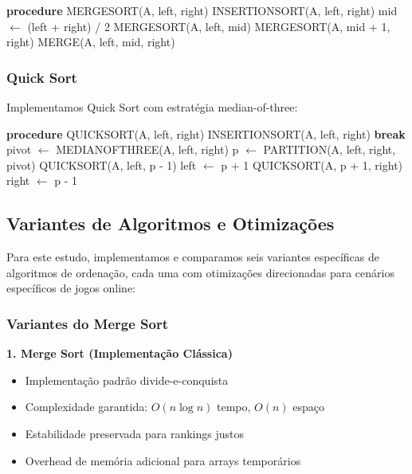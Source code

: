 \documentclass[conference]{IEEEtran}
\begin{document}
\begin{algorithmic}[1]
\STATE \textbf{procedure} MERGESORT(A, left, right)
    \STATE INSERTIONSORT(A, left, right)
\ELSE
    \STATE mid $\leftarrow$ (left + right) / 2
    \STATE MERGESORT(A, left, mid)
    \STATE MERGESORT(A, mid + 1, right)
    \STATE MERGE(A, left, mid, right)
\ENDIF
\end{algorithmic}

\subsubsection{Quick Sort}
Implementamos Quick Sort com estratégia median-of-three:

\begin{algorithmic}[1]
\STATE \textbf{procedure} QUICKSORT(A, left, right)
        \STATE INSERTIONSORT(A, left, right)
        \STATE \textbf{break}
    \ENDIF
    \STATE pivot $\leftarrow$ MEDIANOFTHREE(A, left, right)
    \STATE p $\leftarrow$ PARTITION(A, left, right, pivot)
        \STATE QUICKSORT(A, left, p - 1)
        \STATE left $\leftarrow$ p + 1
    \ELSE
        \STATE QUICKSORT(A, p + 1, right)
        \STATE right $\leftarrow$ p - 1
    \ENDIF
\ENDWHILE
\end{algorithmic}

\subsection{Variantes de Algoritmos e Otimizações}

Para este estudo, implementamos e comparamos seis variantes específicas de algoritmos de ordenação, cada uma com otimizações direcionadas para cenários específicos de jogos online:

\subsubsection{Variantes do Merge Sort}

\textbf{1. Merge Sort (Implementação Clássica)}
\begin{itemize}
\item Implementação padrão divide-e-conquista
\item Complexidade garantida: $O(n \log n)$ tempo, $O(n)$ espaço
\item Estabilidade preservada para rankings justos
\item Overhead de memória adicional para arrays temporários
\end{itemize}
\end{document}
